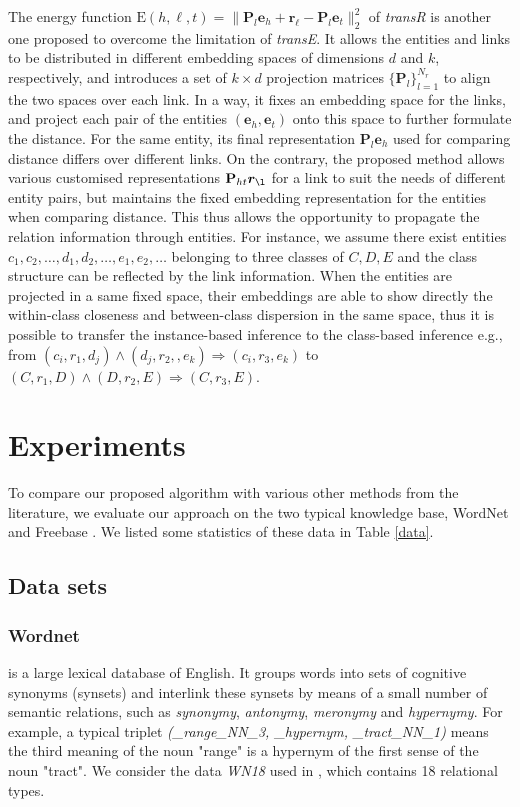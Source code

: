 \documentclass[10pt,journal]{IEEEtran}
\begin{document}
The energy function  $\mathrm{E}{(h,\ell, t)} = \|\textbf{P}_l\bm{e}_h + \bm{r}_{\ell}-\textbf{P}_l\bm{e}_t\|_2^2$ of \emph{transR} \cite{lin_learning_2015} is another one proposed to overcome the limitation of   \emph{transE}. It allows the entities and links to be distributed in different embedding spaces of dimensions $d$ and $k$, respectively, and  introduces a set of $ k\times d$ projection matrices $\{\textbf{P}_l\}_{l=1}^{N_r}$ to align the two spaces over each link. In a way, it fixes an embedding space for the links, and project each pair of the entities $(\bm{e}_h, \bm{e}_t)$ onto this space to further formulate the distance. For the same entity,  its final representation $\textbf{P}_l\bm{e}_h$ used for comparing distance  differs over different links. On the contrary, the proposed method allows various customised representations $\textbf{P}_{ht} \bm{r}_{\l}$ for a link to suit the needs of different entity pairs, but maintains the fixed embedding representation for the entities when comparing distance. This thus allows the opportunity to propagate the relation information through entities. For instance, we assume there exist entities $c_1,c_2, \ldots,d_1,d_2,\ldots, e_1, e_2, \ldots$ belonging to three classes of $C,D,E$ and the class structure can be reflected by the link information.   When the entities are projected in a same fixed space,  their embeddings are able to  show directly the within-class closeness and between-class dispersion in the same space, thus it is possible to  transfer the instance-based inference to the class-based inference e.g., from $(c_i, r_1, d_j) \wedge (d_j, r_2,, e_k) \Rightarrow  (c_i, r_3, e_k)$ to $(C, r_1, D)\wedge (D, r_2, E) \Rightarrow  (C, r_3, E)$.



\section{Experiments}
To compare our proposed algorithm with various other methods from the literature, we evaluate our approach on the two typical knowledge base, WordNet \cite{miller_wordnet:_1995} and Freebase \cite{bollacker_freebase:_2008}. We listed some statistics of these data in Table \ref{data}.

\subsection{Data sets}
\subsubsection{Wordnet} is a large lexical database of English. It groups words into sets of cognitive synonyms (synsets) and interlink these synsets by means of a small number of semantic relations, such as \emph{synonymy}, \emph{antonymy}, \emph{meronymy} and \emph{hypernymy}.  For example, a typical triplet \emph{(\_range\_NN\_3, \_hypernym, \_tract\_NN\_1)} means the third meaning of the noun "range"  is a hypernym of the first sense of the noun "tract". We consider the data \emph{WN18} used in \cite{bordes_semantic_2014}, which contains 18 relational types.
\end{document}
